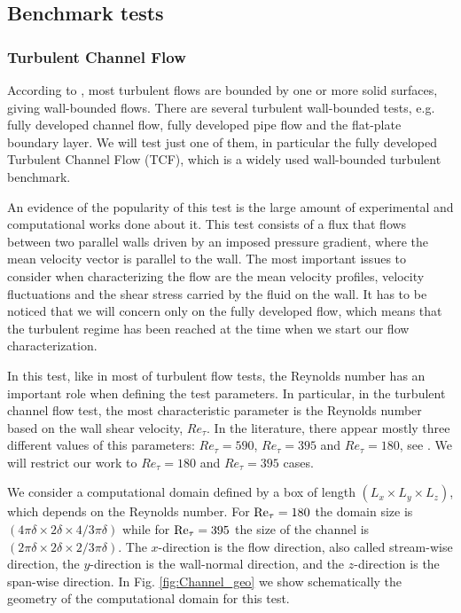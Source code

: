 \subsection{Benchmark tests}
\subsubsection{Turbulent Channel Flow}
\label{subsubsec-C3_TCF}
According to \cite{pope_turbulent_2000}, most turbulent flows are bounded by one or more solid surfaces, giving wall-bounded flows. There are several turbulent wall-bounded tests, e.g. fully developed channel flow, fully developed pipe flow and the flat-plate boundary layer. We will test just one of them, in particular the fully developed Turbulent Channel Flow (TCF), which is a widely used wall-bounded turbulent benchmark. 

An evidence of the popularity of this test is the large amount of experimental and computational works done about it. This test consists of a flux that flows between two parallel walls driven by an imposed pressure gradient, where the mean velocity vector is parallel to the wall. The most important issues to consider when characterizing the flow are the mean velocity profiles, velocity fluctuations and the shear stress carried by the fluid on the wall. It has to be noticed that we will concern only on the fully developed flow, which means that the turbulent regime has been reached at the time when we start our flow characterization.

In this test, like in most of turbulent flow tests, the Reynolds number has an important role when defining the test parameters. In particular, in the turbulent channel flow test, the most characteristic parameter is the Reynolds number based on the wall shear velocity, $Re_\tau$. In the literature, there appear mostly three different values of this parameters: $Re_\tau=590$, $Re_\tau=395$  and $Re_\tau=180$, see \cite{bazilevs_variational_2007, calderer_residual-based_2013, gamnitzer_time-dependent_2010, gravemeier_algebraic_2010, gullbrand_effect_2003, hughes_large_2001, john_variants_2008, kim_turbulence_1987, masud_variational_2011, moser_direct_1999}. We will restrict our work to $Re_\tau=180$ and $Re_\tau=395$ cases.

We consider a computational domain defined by a box of length $(L_x\times L_y\times L_z)$, which depends on the Reynolds number. For ${\rm Re}_\tau=180$ the domain size is $(4\pi\delta\times 2\delta\times 4/3\pi\delta)$ while for  ${\rm Re}_\tau=395$ the size of the channel is $(2\pi\delta\times 2\delta\times 2/3\pi\delta)$. The $x$-direction is the flow direction, also called stream-wise direction, the $y$-direction is the wall-normal direction, and the $z$-direction is the span-wise direction. In Fig. \ref{fig:Channel_geo} we show schematically the geometry of the computational domain for this test.

